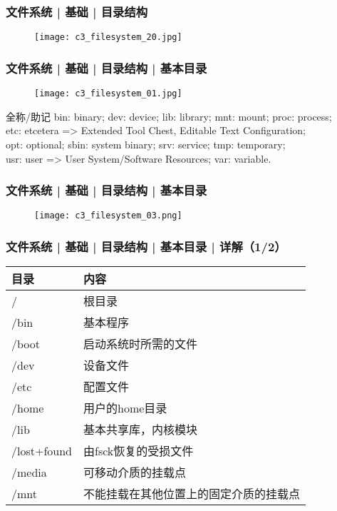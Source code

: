\begin{frame}
  \frametitle{文件系统 | 基础 | \alert{目录结构}}
  \begin{figure}
    \centering
    \texttt{[image: c3\_filesystem\_20.jpg]}
  \end{figure}
\end{frame}

\begin{frame}
  \frametitle{文件系统 | 基础 | 目录结构 | \alert{基本目录}}
  \begin{figure}
    \centering
    \texttt{[image: c3\_filesystem\_01.jpg]}
  \end{figure}
  \pause
  \begin{block}{全称/助记}
    bin: binary; dev: device; lib: library; mnt: mount; proc: process;\\
  etc: etcetera => Extended Tool Chest, Editable Text Configuration;\\
  opt: optional; sbin: system binary; srv: service; tmp: temporary;\\
  usr: user => User System/Software Resources; var: variable.
\end{block}
\end{frame}

\begin{frame}
  \frametitle{文件系统 | 基础 | 目录结构 | \alert{基本目录}}
  \begin{figure}
    \centering
    \texttt{[image: c3\_filesystem\_03.png]}
  \end{figure}
\end{frame}

\begin{frame}
  \frametitle{文件系统 | 基础 | 目录结构 | \alert{基本目录} | 详解（1/2）}
  \begin{table}
    \centering
    \begin{tabular}{ll}
      \hline
      \rowcolor{blue!50}目录 & 内容\\
      \hline
      / & 根目录\\
      /bin & 基本程序\\
      /boot & 启动系统时所需的文件\\
      /dev & 设备文件\\
      /etc & 配置文件\\
      /home & 用户的home目录\\
      /lib & 基本共享库，内核模块\\
      /lost+found & 由fsck恢复的受损文件\\
      /media & 可移动介质的挂载点\\
      /mnt & 不能挂载在其他位置上的固定介质的挂载点\\
      \hline
    \end{tabular}
  \end{table}
\end{frame}

